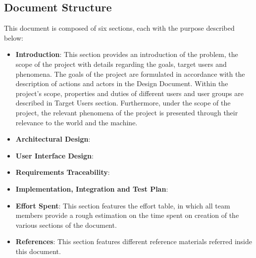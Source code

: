 \subsection{Document Structure}
This document is composed of six sections, each with the purpose described below: \\
\begin{itemize}
    \item \textbf{Introduction}: This section provides an introduction of the problem, the scope of the project with details regarding the goals, target users and phenomena.
    The goals of the project are formulated in accordance with the description of actions and actors in the Design Document.
    Within the project's scope, properties and duties of different users and user groups are described in Target Users section.
    Furthermore, under the scope of the project, the relevant phenomena of the project is presented through their relevance to the world and the machine.
    \item \textbf{Architectural Design}:
    \item \textbf{User Interface Design}:

    \item \textbf{Requirements Traceability}:
    \item \textbf{Implementation, Integration and Test Plan}:
    \item \textbf{Effort Spent}: This section features the effort table, in which all team members provide a rough estimation on the time spent on creation of the various sections of the document.
    \item \textbf{References}: This section features different reference materials referred inside this document.
\end{itemize}
